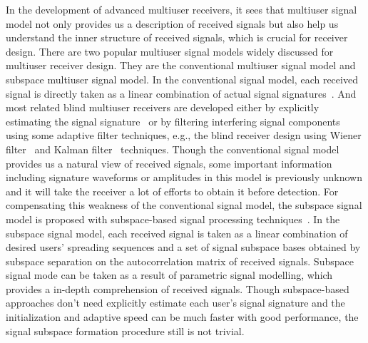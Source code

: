 \documentclass[a4paper,10pt,fleqn, twocolumn]{IEEETran}
\begin{document}
In the development of advanced multiuser receivers, it sees that
multiuser signal model not only provides us a description of
received signals but also help us understand the inner structure
of received signals, which is crucial for receiver design. There
are two popular multiuser signal models widely discussed for
multiuser receiver design. They are the conventional multiuser
signal model and subspace multiuser signal model. In the
conventional signal model, each received signal is directly taken
as a linear combination of actual signal
signatures~\cite{Verd98,Madh94,Honi95,Zhang02}. And most related
blind multiuser receivers are developed either by explicitly
estimating the signal signature~\cite{Torl97} or by filtering
interfering signal components using some adaptive filter
techniques, e.g., the blind receiver design using Wiener
filter~\cite{Madh94,Honi95} and Kalman filter~\cite{Zhang02}
techniques. Though the conventional signal model provides us a
natural view of received signals, some important information
including signature waveforms or amplitudes in this model is
previously unknown and it will take the receiver a lot of efforts
to obtain it before detection. For compensating this weakness of
the conventional signal model, the subspace signal model is
proposed with subspace-based signal processing
techniques~\cite{Wang98}. In the subspace signal model, each
received signal is taken as a linear combination of desired users'
spreading sequences and a set of signal subspace bases obtained by
subspace separation on the autocorrelation matrix of received
signals. Subspace signal mode can be taken as a result of
parametric signal modelling, which provides a in-depth
comprehension of received signals. Though subspace-based
approaches don't need explicitly estimate each user's signal
signature and the initialization and adaptive speed can be much
faster with good performance, the signal subspace formation
procedure still is not trivial.
\end{document}
